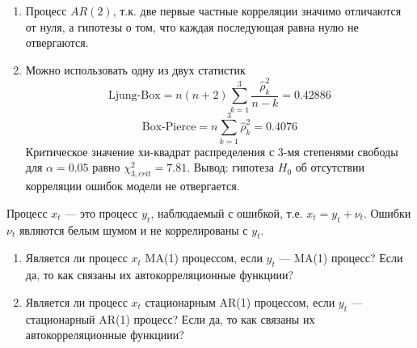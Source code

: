 \begin{problem}
\begin{sol}
\begin{enumerate}
\item Процесс $AR(2)$, т.к. две первые частные корреляции значимо отличаются от нуля, а гипотезы о том, что каждая последующая равна нулю не отвергаются.
\item Можно использовать одну из двух статистик
\[
\text{Ljung-Box}=n(n+2)\sum_{k=1}^3\frac{\hat{\rho}_k^2}{n-k}=
0.42886
\]
\[
\text{Box-Pierce}=n\sum_{k=1}^3\hat{\rho}_k^2=
0.4076
\]
Критическое значение хи-квадрат распределения с 3-мя степенями свободы для $\alpha=0.05$ равно $\chi^2_{3,crit}=7.81$.
Вывод: гипотеза $H_0$ об отсутствии корреляции ошибок модели не отвергается.
\end{enumerate}
\end{sol}
\end{problem}




\begin{problem}
Процесс $x_t$ — это процесс $y_t$, наблюдаемый с ошибкой, т.е. $x_t=y_t+\nu_t$. Ошибки $\nu_t$ являются белым шумом и не коррелированы с $y_t$.
\begin{enumerate}
\item Является ли процесс $x_t$ MA(1) процессом, если $y_t$ —  MA(1) процесс? Если да, то как связаны их автокорреляционные функциии?
\item Является ли процесс $x_t$ стационарным AR(1) процессом, если $y_t$ —  стационарный AR(1) процесс? Если да, то как связаны их автокорреляционные функциии?
\end{enumerate}


\begin{sol}

\end{sol}
\end{problem}


